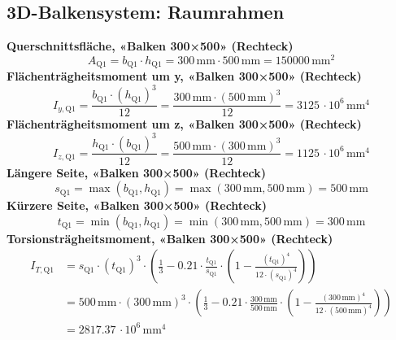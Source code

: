 \documentclass[11pt,a4paper]{article}
\begin{document}
\subsection{3D-Balkensystem: Raumrahmen}
\noindent\textbf{Querschnittsfläche, «Balken 300×500» (Rechteck)}
\begin{equation*}
A_{\text{Q1}} = b_{\text{Q1}} \cdot h_{\text{Q1}} = 300\,\mathrm{mm} \cdot 500\,\mathrm{mm} = 150000\,\mathrm{mm}^{2}
\end{equation*}
\noindent\textbf{Flächenträgheitsmoment um y, «Balken 300×500» (Rechteck)}
\begin{equation*}
I_{y,\text{Q1}} = \frac{b_{\text{Q1}} \cdot \left(h_{\text{Q1}}\right)^{3}}{12} = \frac{300\,\mathrm{mm} \cdot \left(500\,\mathrm{mm}\right)^{3}}{12} = 3125\,\cdot 10^{6}\,\mathrm{mm}^{4}
\end{equation*}
\noindent\textbf{Flächenträgheitsmoment um z, «Balken 300×500» (Rechteck)}
\begin{equation*}
I_{z,\text{Q1}} = \frac{h_{\text{Q1}} \cdot \left(b_{\text{Q1}}\right)^{3}}{12} = \frac{500\,\mathrm{mm} \cdot \left(300\,\mathrm{mm}\right)^{3}}{12} = 1125\,\cdot 10^{6}\,\mathrm{mm}^{4}
\end{equation*}
\noindent\textbf{Längere Seite, «Balken 300×500» (Rechteck)}
\begin{equation*}
s_{\text{Q1}} = \max\left(b_{\text{Q1}}, h_{\text{Q1}}\right) = \max\left(300\,\mathrm{mm}, 500\,\mathrm{mm}\right) = 500\,\mathrm{mm}
\end{equation*}
\noindent\textbf{Kürzere Seite, «Balken 300×500» (Rechteck)}
\begin{equation*}
t_{\text{Q1}} = \min\left(b_{\text{Q1}}, h_{\text{Q1}}\right) = \min\left(300\,\mathrm{mm}, 500\,\mathrm{mm}\right) = 300\,\mathrm{mm}
\end{equation*}
\noindent\textbf{Torsionsträgheitsmoment, «Balken 300×500» (Rechteck)}
\begin{equation*}
\begin{aligned}
  I_{T,\text{Q1}} &= s_{\text{Q1}} \cdot \left(t_{\text{Q1}}\right)^{3} \cdot \left(\frac{1}{3} - 0.21 \cdot \frac{t_{\text{Q1}}}{s_{\text{Q1}}} \cdot \left(1 - \frac{\left(t_{\text{Q1}}\right)^{4}}{12 \cdot \left(s_{\text{Q1}}\right)^{4}}\right)\right) \\
  &= 500\,\mathrm{mm} \cdot \left(300\,\mathrm{mm}\right)^{3} \cdot \left(\frac{1}{3} - 0.21 \cdot \frac{300\,\mathrm{mm}}{500\,\mathrm{mm}} \cdot \left(1 - \frac{\left(300\,\mathrm{mm}\right)^{4}}{12 \cdot \left(500\,\mathrm{mm}\right)^{4}}\right)\right) \\
  &= 2817.37\,\cdot 10^{6}\,\mathrm{mm}^{4}
\end{aligned}
\end{equation*}
\end{document}
